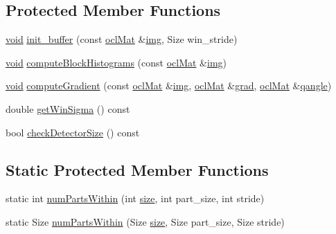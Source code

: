 \subsection*{Protected Member Functions}
\begin{DoxyCompactItemize}
\item 
\hyperlink{legacy_8hpp_a8bb47f092d473522721002c86c13b94e}{void} \hyperlink{structcv_1_1ocl_1_1HOGDescriptor_ad2617f2a47388bdaacfa6ba1de50475b}{init\-\_\-buffer} (const \hyperlink{classcv_1_1ocl_1_1oclMat}{ocl\-Mat} \&\hyperlink{legacy_8hpp_a5349238b3772bed6eae0fda3117ccfef}{img}, Size win\-\_\-stride)
\item 
\hyperlink{legacy_8hpp_a8bb47f092d473522721002c86c13b94e}{void} \hyperlink{structcv_1_1ocl_1_1HOGDescriptor_a1caa8dcc80bdfc9c601a24f4e29a73d4}{compute\-Block\-Histograms} (const \hyperlink{classcv_1_1ocl_1_1oclMat}{ocl\-Mat} \&\hyperlink{legacy_8hpp_a5349238b3772bed6eae0fda3117ccfef}{img})
\item 
\hyperlink{legacy_8hpp_a8bb47f092d473522721002c86c13b94e}{void} \hyperlink{structcv_1_1ocl_1_1HOGDescriptor_abf81df13748667e19915e3f3ae94215c}{compute\-Gradient} (const \hyperlink{classcv_1_1ocl_1_1oclMat}{ocl\-Mat} \&\hyperlink{legacy_8hpp_a5349238b3772bed6eae0fda3117ccfef}{img}, \hyperlink{classcv_1_1ocl_1_1oclMat}{ocl\-Mat} \&\hyperlink{structcv_1_1ocl_1_1HOGDescriptor_a1d40070e508df4b2629f66f8d2a34618}{grad}, \hyperlink{classcv_1_1ocl_1_1oclMat}{ocl\-Mat} \&\hyperlink{structcv_1_1ocl_1_1HOGDescriptor_a35ab7536fc22a7751c929d63543e31cc}{qangle})
\item 
double \hyperlink{structcv_1_1ocl_1_1HOGDescriptor_ae8013894c9c94834408b244bd876b37f}{get\-Win\-Sigma} () const 
\item 
bool \hyperlink{structcv_1_1ocl_1_1HOGDescriptor_a6bbd154a01496d02665dd1b3478404d7}{check\-Detector\-Size} () const 
\end{DoxyCompactItemize}
\subsection*{Static Protected Member Functions}
\begin{DoxyCompactItemize}
\item 
static int \hyperlink{structcv_1_1ocl_1_1HOGDescriptor_a81c89d7aaf0b7c5e1a06ceba8ac9b287}{num\-Parts\-Within} (int \hyperlink{legacy_8hpp_ae97003f8d5c64cdfb99f6f2606d121b6}{size}, int part\-\_\-size, int stride)
\item 
static Size \hyperlink{structcv_1_1ocl_1_1HOGDescriptor_a51a4fa0091e7b9220ba2d0d240debda9}{num\-Parts\-Within} (Size \hyperlink{legacy_8hpp_ae97003f8d5c64cdfb99f6f2606d121b6}{size}, Size part\-\_\-size, Size stride)
\end{DoxyCompactItemize}

